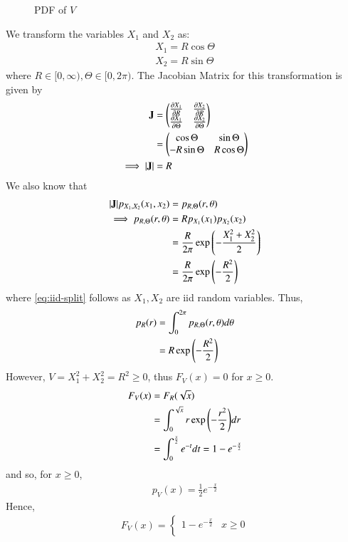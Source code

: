 \documentclass[journal,12pt,twocolumn]{IEEEtran}
\renewcommand\thesection{\arabic{section}}
\begin{document}
\begin{enumerate}[label=\thesection.\arabic*
,ref=\thesection.\theenumi]
\begin{figure}
			\caption{PDF of $V$}
			\label{fig:chi-pdf}
		\end{figure}
We transform the variables $X_1$ and $X_2$ as:
		\begin{align}
			X_1 = R\cos{\Theta} \\
			X_2 = R\sin{\Theta}
		\end{align}
where $R \in [0, \infty), \Theta \in [0, 2\pi)$. The Jacobian Matrix for this transformation is given by
		\begin{align}
			\mathbf{J} &= \begin{pmatrix}\frac{\partial X_1}{\partial R} & \frac{\partial X_2}{\partial R} \\
							 \frac{\partial X_1}{\partial \Theta} & \frac{\partial X_2}{\partial \Theta}\end{pmatrix} \\
					&= \begin{pmatrix}\cos{\Theta} & \sin{\Theta} \\
							  -R\sin{\Theta} & R\cos{\Theta}\end{pmatrix} \\
			\implies |\mathbf{J}| &= R
			\label{eq:Jacobian}
		\end{align}
We also know that
		\begin{align}
			|\mathbf{J}|p_{X_1, X_2}(x_1, x_2) &= p_{R, \Theta}(r, \theta) \\
			\implies p_{R, \Theta}(r, \theta) &= Rp_{X_1}(x_1)p_{X_2}(x_2) \label{eq:iid-split} \\
			&= \frac{R}{2\pi}\exp{\ensuremath{\left(-\frac{X_1^2 + X_2^2}{2}\right)}} \\
			&= \frac{R}{2\pi}\exp{\ensuremath{\left(-\frac{R^2}{2}\right)}}
			\label{eq:joint}
		\end{align}
where \eqref{eq:iid-split} follows as $X_1, X_2$ are iid random variables. Thus,
		\begin{align}
			p_R(r) &= \int_{0}^{2\pi}p_{R, \Theta}(r, \theta)d\theta \\
			&= R\exp{\ensuremath{\left(-\frac{R^2}{2}\right)}}
		\end{align}
However, $V = X_1^2 + X_2^2 = R^2 \geq 0$, thus $F_V(x) = 0$ for $x \geq 0$.
		\begin{align}
			F_V(x) &= F_R(\sqrt{x}) \\ 
			&= \int_{0}^{\sqrt{x}}r\exp{\ensuremath{\left(-\frac{r^2}{2}\right)}}dr \\
			&= \int_{0}^{\frac{x}{2}}e^{-t}dt = 1 - e^{-\frac{x}{2}}
		\end{align}
and so, for $x \geq 0$, 
		\begin{align}
			p_V(x) = \frac{1}{2}e^{-\frac{x}{2}}
		\end{align}
Hence, 
		\begin{align}
			F_V(x) = 
			\begin{cases}
				1 - e^{-\frac{x}{2}} & x \geq 0 \\

\end{cases}
\end{align}
\end{enumerate}
\end{document}
